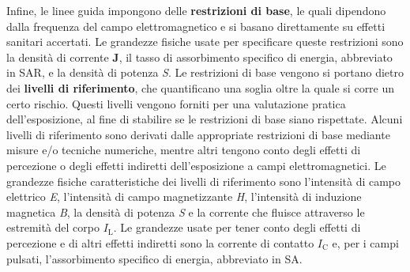 \documentclass{report}
\numberwithin{equation}{section}
\numberwithin{figure}{section}
\renewcommand{\Vec}{\bm}
\begin{document}
Infine, le linee guida impongono delle \textbf{restrizioni di base}, le quali dipendono dalla frequenza del campo elettromagnetico e si basano direttamente su effetti sanitari accertati. Le grandezze fisiche usate per specificare queste restrizioni sono la densità di corrente $\Vec{J}$, il tasso di assorbimento specifico di energia, abbreviato in SAR, e la densità di potenza \textit{S}. Le restrizioni di base vengono si portano dietro dei \textbf{livelli di riferimento}, che quantificano una soglia oltre la quale si corre un certo rischio. Questi livelli vengono forniti per una valutazione pratica dell'esposizione, al fine di stabilire se le restrizioni di base siano rispettate. Alcuni livelli di riferimento sono derivati dalle appropriate restrizioni di base mediante misure e/o tecniche numeriche, mentre altri tengono conto degli effetti di percezione o degli effetti indiretti dell'esposizione a campi elettromagnetici. Le grandezze fisiche caratteristiche dei livelli di riferimento sono l’intensità di campo elettrico \textit{E}, l’intensità di campo magnetizzante \textit{H}, l’intensità di induzione magnetica \textit{B}, la densità di potenza \textit{S} e la corrente che fluisce attraverso le estremità del corpo $I_\mathrm{L}$. Le grandezze usate per tener conto degli effetti di percezione e di altri effetti indiretti sono la corrente di contatto $I_\mathrm{C}$ e, per i campi pulsati, l’assorbimento specifico di energia, abbreviato in SA.
\end{document}
